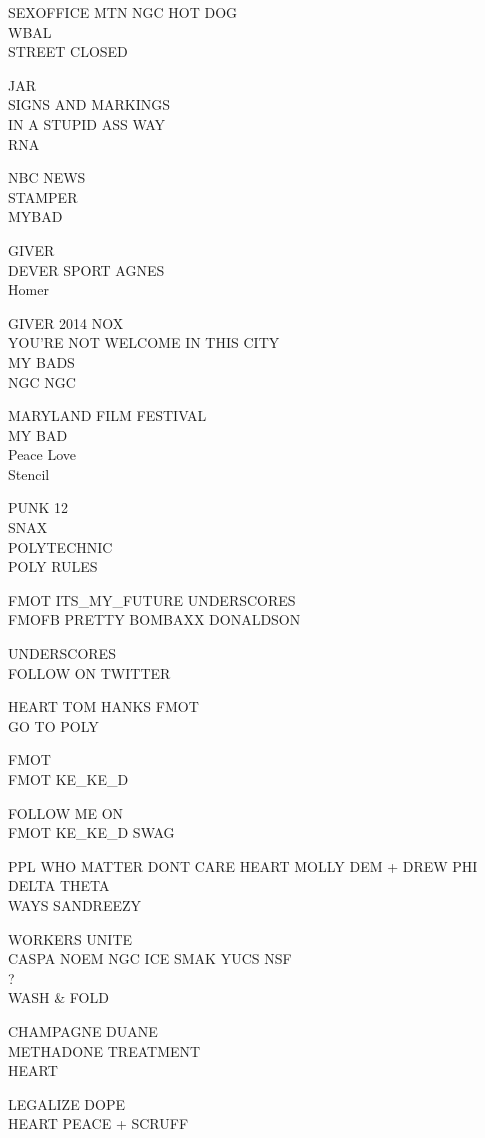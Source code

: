 \documentclass[10pt,letterpaper]{article}
\begin{document}
SEXOFFICE MTN NGC HOT DOG\\
WBAL\\
STREET CLOSED

JAR\\
SIGNS AND MARKINGS\\
IN A STUPID ASS WAY\\
RNA

NBC NEWS\\
STAMPER\\
MYBAD

GIVER\\
DEVER SPORT AGNES\\
Homer

GIVER 2014 NOX\\
YOU'RE NOT WELCOME IN THIS CITY\\
MY BADS\\
NGC NGC

MARYLAND FILM FESTIVAL\\
MY BAD\\
Peace Love\\
Stencil

PUNK 12\\
SNAX\\
POLYTECHNIC\\
POLY RULES

FMOT ITS\_MY\_FUTURE UNDERSCORES\\
FMOFB PRETTY BOMBAXX DONALDSON

UNDERSCORES\\
FOLLOW ON TWITTER

HEART TOM HANKS FMOT\\
GO TO POLY

FMOT\\
FMOT KE\_KE\_D

FOLLOW ME ON\\
FMOT KE\_KE\_D SWAG

PPL WHO MATTER DONT CARE HEART MOLLY DEM + DREW PHI DELTA THETA\\
WAYS SANDREEZY

WORKERS UNITE\\
CASPA NOEM NGC ICE SMAK YUCS NSF\\
?\\
WASH \& FOLD

CHAMPAGNE DUANE\\
METHADONE TREATMENT\\
HEART

LEGALIZE DOPE\\
HEART PEACE + SCRUFF
\end{document}
